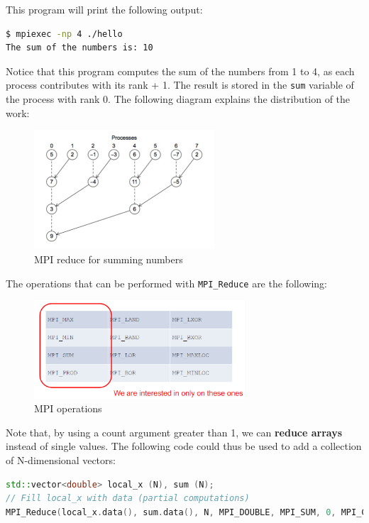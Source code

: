 This program will print the following output:

\begin{lstlisting}[language=bash]
$ mpiexec -np 4 ./hello
The sum of the numbers is: 10
\end{lstlisting}

Notice that this program computes the sum of the numbers from 1 to 4, as each process
contributes with its rank + 1. The result is stored in the \texttt{sum} variable of the
process with rank 0. The following diagram explains the distribution of the work:

\begin{figure}[H]
    \centering
    \includegraphics[width=0.6\textwidth]{figures/MPI_reduce.png}
    \caption{MPI reduce for summing numbers}
    \label{fig:mpi_reduce}
\end{figure}

The operations that can be performed with \texttt{MPI\_Reduce} are the following:

\begin{figure}[H]
    \centering
    \includegraphics[width=0.7\textwidth]{figures/MPI_operations.png}
    \caption{MPI operations}
    \label{fig:mpi_operations}
\end{figure}

Note that, by using a count argument greater than 1, we can \textbf{reduce arrays} instead of single
values. The following code could thus be used to add a collection of N-dimensional vectors:

\begin{lstlisting}[language=C++]
std::vector<double> local_x (N), sum (N);
// Fill local_x with data (partial computations)
MPI_Reduce(local_x.data(), sum.data(), N, MPI_DOUBLE, MPI_SUM, 0, MPI_COMM_WORLD);
\end{lstlisting}

